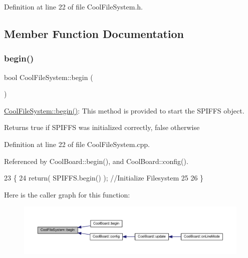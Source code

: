 Definition at line 22 of file Cool\+File\+System.\+h.



\subsection{Member Function Documentation}
\mbox{\label{classCoolFileSystem_a6ba6f666ed4c530174f8569d2c636748}} 
\subsubsection{\texorpdfstring{begin()}{begin()}}
{\footnotesize\ttfamily bool Cool\+File\+System\+::begin (\begin{DoxyParamCaption}{ }\end{DoxyParamCaption})}

\hyperlink{classCoolFileSystem_a6ba6f666ed4c530174f8569d2c636748}{Cool\+File\+System\+::begin()}\+: This method is provided to start the S\+P\+I\+F\+FS object.

\begin{DoxyReturn}{Returns}
true if S\+P\+I\+F\+FS was initialized correctly, false otherwise 
\end{DoxyReturn}


Definition at line 22 of file Cool\+File\+System.\+cpp.



Referenced by Cool\+Board\+::begin(), and Cool\+Board\+::config().


\begin{DoxyCode}
23 \{
24     \textcolor{keywordflow}{return}( SPIFFS.begin() );                                   \textcolor{comment}{//Initialize Filesystem}
25 
26 \}
\end{DoxyCode}
Here is the caller graph for this function\+:
\nopagebreak
\begin{figure}[H]
\begin{center}
\leavevmode
\includegraphics[width=350pt]{classCoolFileSystem_a6ba6f666ed4c530174f8569d2c636748_icgraph}
\end{center}
\end{figure}
\mbox{\label{classCoolFileSystem_a4c560c2ddd40b74b7758e6ceb2c58957}} 

